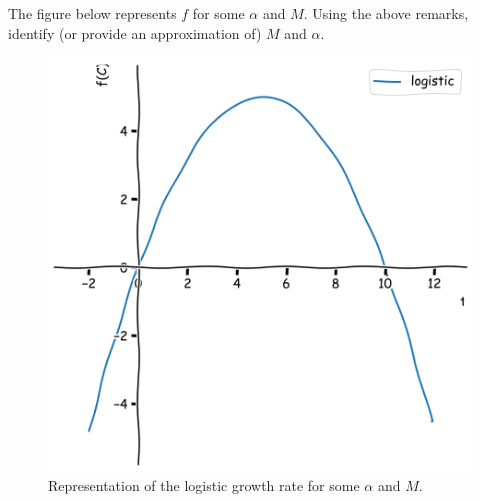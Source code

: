 \begin{Exercise}
The figure below represents $f$ for some $\alpha$ and $M $. Using the above remarks, identify (or provide an approximation of) $M$ and $\alpha$.\\
\begin{figure}[h!]
  \centering
  \includegraphics[width=0.4\linewidth]{img/logistic.png}
  \caption{Representation of the logistic growth rate for some $\alpha $ and $M$.}
  \label{fig:logistic}
 \end{figure}
 \dotfill

\dotfill

\dotfill

\dotfill

\dotfill

\dotfill

\dotfill

\dotfill

\dotfill

\dotfill
 \end{Exercise}
 
